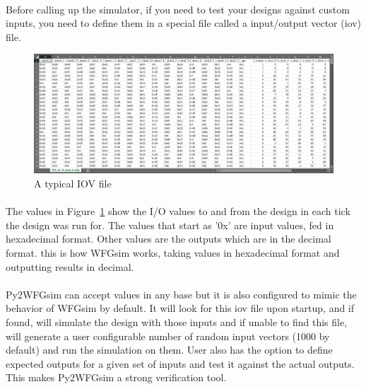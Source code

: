 \paragraph{}
Before calling up the simulator, if you need to test your designs against custom inputs, you need to define them in a special file called a input/output vector (iov) file.

\begin{figure}[H]
    \centering
    \includegraphics[trim=0cm 0cm 0cm 0cm, clip=true,scale=0.4]{figures/iov.jpg}
    \caption{A typical IOV file\label{Fig:iov}}\vspace{-4mm}
    \end{figure}

\paragraph{}
The values in Figure~\ref{Fig:iov} show the I/O values to and from the design in each tick the design was run for. The values that start as '0x' are input values, fed in hexadecimal format. Other values are the outputs which are in the decimal format. this is how WFGsim works, taking values in hexadecimal format and outputting results in decimal. 

\paragraph{}
Py2WFGsim can accept values in any base but it is also configured to mimic the behavior of WFGsim by default. It will look for this iov file upon startup, and if found, will simulate the design with those inputs and if unable to find this file, will generate a user configurable number of random input vectors (1000 by default) and run the simulation on them. User also has the option to define expected outputs for a given set of inputs and test it against the actual outputs. This makes Py2WFGsim a strong verification tool.


